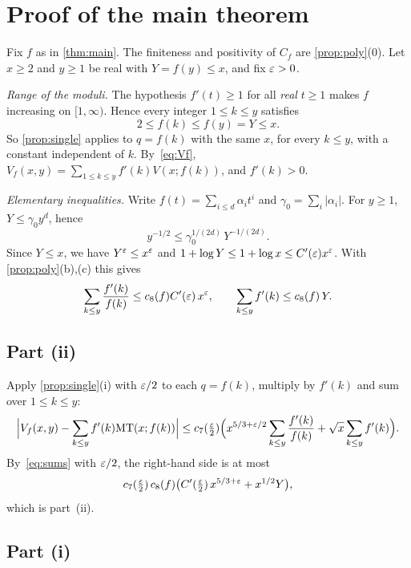 \section{Proof of the main theorem}\label{sec:assembly}

Fix $f$ as in \cref{thm:main}. The finiteness and positivity of $C_f$ are \cref{prop:poly}(0). Let $x\ge2$ and $y\ge1$ be real with $Y=f(y)\le x$, and fix $\varepsilon>0$.

\emph{Range of the moduli.} The hypothesis $f'(t)\ge1$ for all \emph{real} $t\ge1$ makes $f$ increasing on $[1,\infty)$. Hence every integer $1\le k\le y$ satisfies
\begin{equation}\label{eq:moduli-range}
2\le f(k)\le f(y)=Y\le x .
\end{equation}
So \cref{prop:single} applies to $q=f(k)$ with the same $x$, for every $k\le y$, with a constant independent of $k$. By~\eqref{eq:Vf}, $V_f(x,y)=\sum_{1\le k\le y}f'(k)V(x;f(k))$, and $f'(k)>0$.

\emph{Elementary inequalities.} Write $f(t)=\sum_{i\le d}\alpha_it^i$ and $\gamma_0=\sum_i|\alpha_i|$. For $y\ge1$, $Y\le\gamma_0y^d$, hence
\begin{equation}\label{eq:y-Y}
y^{-1/2}\le\gamma_0^{1/(2d)}\,Y^{-1/(2d)}.
\end{equation}
Since $Y\le x$, we have $Y^\varepsilon\le x^\varepsilon$ and $1+\log Y\le1+\log x\le C'(\varepsilon)x^\varepsilon$. With \cref{prop:poly}(b),(c) this gives
\begin{equation}\label{eq:sums}
\sum_{k\le y}\frac{f'(k)}{f(k)}\le c_8(f)C'(\varepsilon)\,x^{\varepsilon},\qquad\sum_{k\le y}f'(k)\le c_8(f)\,Y .
\end{equation}

\subsection{Part (ii)}

Apply \cref{prop:single}(i) with $\varepsilon/2$ to each $q=f(k)$, multiply by $f'(k)$ and sum over $1\le k\le y$:
\[
\Bigl|V_f(x,y)-\sum_{k\le y}f'(k)\mathrm{MT}(x;f(k))\Bigr|\le c_7(\tfrac{\varepsilon}2)\Bigl(x^{5/3+\varepsilon/2}\sum_{k\le y}\frac{f'(k)}{f(k)}+\sqrt x\sum_{k\le y}f'(k)\Bigr).
\]
By~\eqref{eq:sums} with $\varepsilon/2$, the right-hand side is at most
\[
c_7(\tfrac{\varepsilon}2)\,c_8(f)\bigl(C'(\tfrac{\varepsilon}2)\,x^{5/3+\varepsilon}+x^{1/2}Y\bigr),
\]
which is part~(ii).

\subsection{Part (i)}

